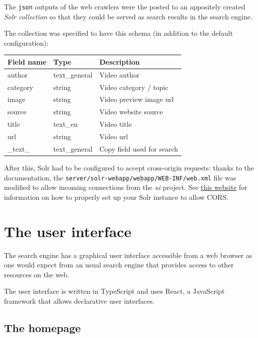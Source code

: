 \documentclass[12pt]{exam}
\begin{document}
The \texttt{json} outputs of the web crawlers were the posted to
an appositely created \textit{Solr collection} so that they could be served
as search results in the search engine.

The collection was specified to have this schema (in addition to the default
configuration):

\begin{center}
\begin{tabular}{lll}
Field name & Type          & Description                \\\hline
author     & text\_general & Video author               \\
category   & string        & Video category / topic     \\
image      & string        & Video preview image url    \\
source     & string        & Video website source       \\
title      & text\_en      & Video title                \\
url        & string        & Video url                  \\\hline
\_text\_   & text\_general & Copy field used for search \\
\end{tabular}
\end{center}

After this, Solr had to be configured to accept cross-origin requests:
thanks to the documentation, the
\texttt{server/solr-webapp/webapp/WEB-INF/web.xml} file was modified
to allow incoming connections from the \textit{ui} project.
See \href{http://laurenthinoul.com/how-to-enable-cors-in-solr/}{this website}
for information on how to properly set up your Solr instance to allow CORS.

\newpage

\section{The user interface}

The search engine has a graphical user interface accessible from a web
browser as one would expect from an usual search engine that provides
access to other resources on the web.

The user interface is written in TypeScript and uses React, a JavaScript
framework that allows declarative user interfaces.

\subsection{The homepage}
\end{document}
